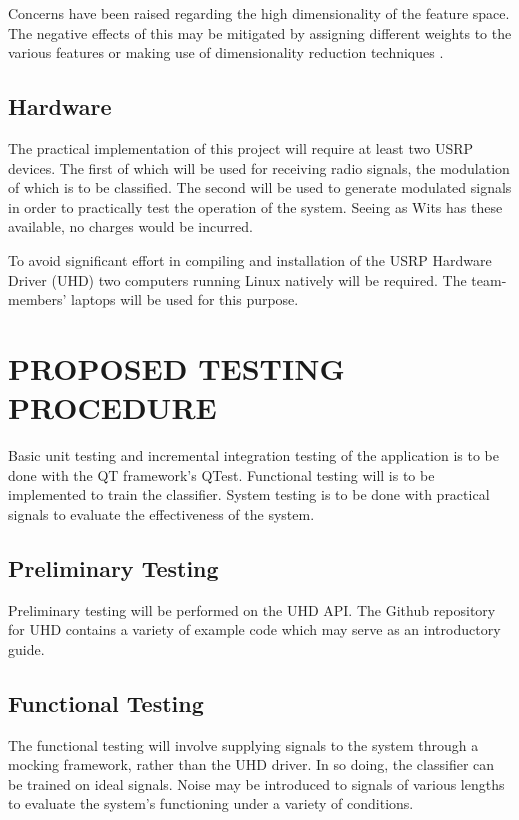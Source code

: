 \documentclass[10pt,twocolumn]{witseiepaper}
\begin{document}
	Concerns have been raised regarding the high dimensionality of the feature space. The negative effects of this may be mitigated by assigning different weights to the various features or making use of dimensionality reduction techniques \cite{zhu2014automatic}.

	\subsection{Hardware}
		The practical implementation of this project will require at least two USRP devices. The first of which will be used for receiving radio signals, the modulation of which is to be classified. The second will be used to generate modulated signals in order to practically test the operation of the system. Seeing as Wits has these available, no charges would be incurred.

		To avoid significant effort in compiling and installation of the USRP Hardware Driver (UHD) two computers running Linux natively will be required. The team-members' laptops will be used for this purpose.

\section{PROPOSED TESTING PROCEDURE}
	Basic unit testing and incremental integration testing of the application is to be done with the QT framework's QTest. Functional testing will is to be implemented to train the classifier. System testing is to be done with practical signals to evaluate the effectiveness of the system.

	\subsection{Preliminary Testing}
		Preliminary testing will be performed on the UHD API. The Github repository for UHD contains a variety of example code \cite{uhdexample} which may serve as an introductory guide.

	\subsection{Functional Testing}
	\label{sec:mock}
		The functional testing will involve supplying signals to the system through a mocking framework, rather than the UHD driver. In so doing, the classifier can be trained on ideal signals. Noise may be introduced to signals of various lengths to evaluate the system's functioning under a variety of conditions.
\end{document}
